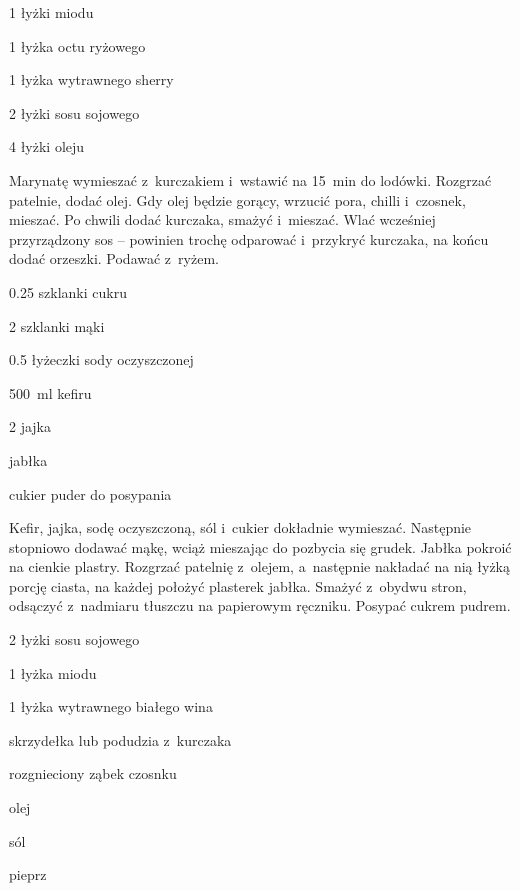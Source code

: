 \documentclass[../kucharek.tex]{subfiles}
\begin{document}
\begin{Ingred}[sos]
    \item \num{1} łyżki miodu
    \item \num{1} łyżka octu ryżowego
    \item \num{1} łyżka wytrawnego sherry
    \item \num{2} łyżki sosu sojowego
    \item \num{4} łyżki oleju
\end{Ingred}

Marynatę wymieszać z~kurczakiem i~wstawić na \qty{15}{\minute} do lodówki.
Rozgrzać patelnie, dodać olej. Gdy olej będzie gorący, wrzucić pora, chilli
i~czosnek, mieszać. Po chwili dodać kurczaka, smażyć i~mieszać. Wlać wcześniej
przyrządzony sos – powinien trochę odparować i~przykryć kurczaka, na końcu
dodać orzeszki. Podawać z~ryżem.


\begin{Ingred}
    \item \num{.25} szklanki cukru
    \item \num{2} szklanki mąki
    \item \num{0.5} łyżeczki sody oczyszczonej
    \item \qty{500}{\milli\litre} kefiru
    \item \num{2} jajka
    \item jabłka
    \item cukier puder do posypania
\end{Ingred}

Kefir, jajka, sodę oczyszczoną, sól i~cukier dokładnie wymieszać. Następnie
stopniowo dodawać mąkę, wciąż mieszając do pozbycia się grudek. Jabłka pokroić
na cienkie plastry. Rozgrzać patelnię z~olejem, a~następnie nakładać na nią
łyżką porcję ciasta, na każdej położyć plasterek jabłka. Smażyć z~obydwu stron,
odsączyć z~nadmiaru tłuszczu na papierowym ręczniku. Posypać cukrem pudrem.


\begin{Ingred}
    \item \num{2} łyżki sosu sojowego
    \item \num{1} łyżka miodu
    \item \num{1} łyżka wytrawnego białego wina
    \item skrzydełka lub podudzia z~kurczaka
    \item rozgnieciony ząbek czosnku
    \item olej
    \item sól
    \item pieprz
\end{Ingred}
\end{document}
